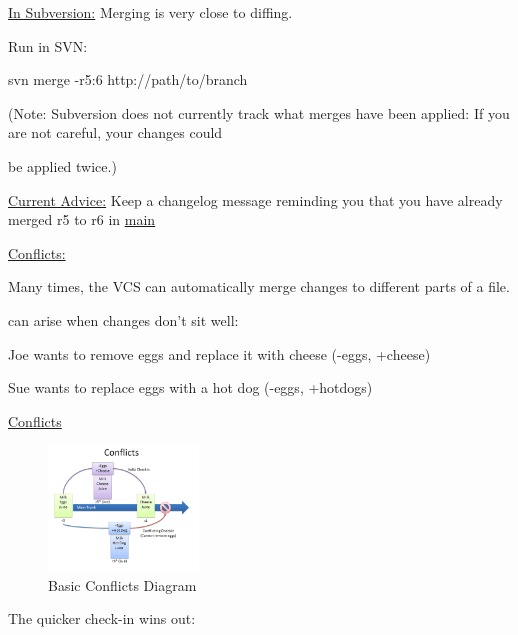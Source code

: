 \documentclass{article}
\begin{document}
\begin{flushleft}
\underline{In Subversion:} Merging is very close to diffing.  \par
Run in SVN: \\
\par

svn merge -r5:6 http://path/to/branch \par
(Note: Subversion does not currently track what merges have been applied: If you are not careful, your changes could \par
be applied twice.) \\
\par

\underline{Current Advice:} Keep a changelog message reminding you that you have already merged r5 to r6 in \underline{main} \\
\par

\underline{Conflicts:} \\
\par

Many times, the VCS can automatically merge changes to different parts of a file. \par
{} can arise when changes don't sit well: \\
\par

Joe wants to remove eggs and replace it with cheese (-eggs, +cheese) \par
Sue wants to replace eggs with a hot dog (-eggs, +hotdogs) \\
\par

\underline{Conflicts} \\
\par


\begin{figure}[htp]
\centering
\includegraphics[width=4cm]{Conflicts.png}
\caption{Basic Conflicts Diagram}
\label{fig:BCDiagram}
\end{figure} 

The quicker check-in wins out: \\
\par


\end{flushleft}
\end{document}
